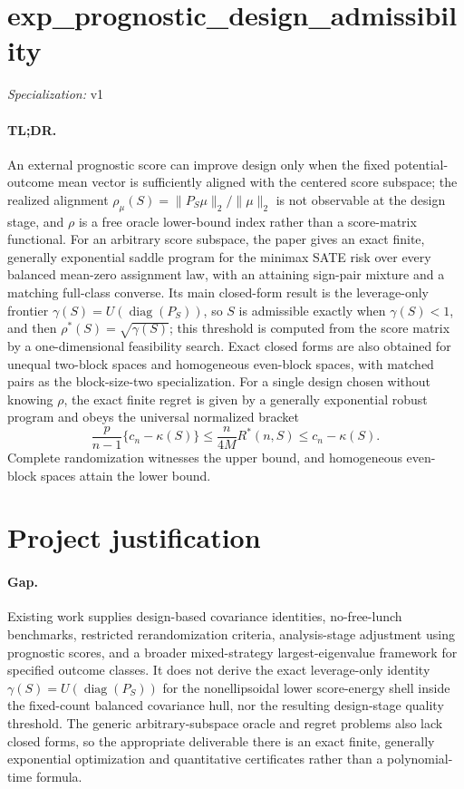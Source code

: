 \documentclass{article}
\begin{document}
\sloppy

\section*{exp\_\allowbreak{}prognostic\_\allowbreak{}design\_\allowbreak{}admissibility}

\noindent\textit{Specialization:} v1\par

\paragraph{TL;DR.} An external prognostic score can improve design only when the fixed potential-outcome mean vector is sufficiently aligned with the centered score subspace; the realized alignment \(\rho_{\mu}(S)=\|P_S\mu\|_2/\|\mu\|_2\) is not observable at the design stage, and \(\rho\) is a free oracle lower-bound index rather than a score-matrix functional. For an arbitrary score subspace, the paper gives an exact finite, generally exponential saddle program for the minimax SATE risk over every balanced mean-zero assignment law, with an attaining sign-pair mixture and a matching full-class converse. Its main closed-form result is the leverage-only frontier \(\gamma(S)=U(\operatorname{diag}(P_S))\), so \(S\) is admissible exactly when \(\gamma(S)<1\), and then \(\rho^*(S)=\sqrt{\gamma(S)}\); this threshold is computed from the score matrix by a one-dimensional feasibility search. Exact closed forms are also obtained for unequal two-block spaces and homogeneous even-block spaces, with matched pairs as the block-size-two specialization. For a single design chosen without knowing \(\rho\), the exact finite regret is given by a generally exponential robust program and obeys the universal normalized bracket \[\frac{p}{n-1}\{c_n-\kappa(S)\}\leq\frac{n}{4M}R^*(n,S)\leq c_n-\kappa(S).\] Complete randomization witnesses the upper bound, and homogeneous even-block spaces attain the lower bound.

\section{Project justification}

\paragraph{Gap.} Existing work supplies design-based covariance identities, no-free-lunch benchmarks, restricted rerandomization criteria, analysis-stage adjustment using prognostic scores, and a broader mixed-strategy largest-eigenvalue framework for specified outcome classes. It does not derive the exact leverage-only identity \(\gamma(S)=U(\operatorname{diag}(P_S))\) for the nonellipsoidal lower score-energy shell inside the fixed-count balanced covariance hull, nor the resulting design-stage quality threshold. The generic arbitrary-subspace oracle and regret problems also lack closed forms, so the appropriate deliverable there is an exact finite, generally exponential optimization and quantitative certificates rather than a polynomial-time formula.
\end{document}
